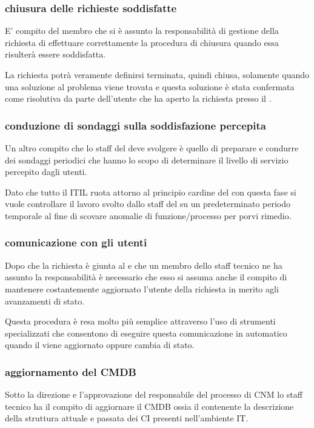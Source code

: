 \subsubsection[Chiusura delle richieste soddisfatte]{chiusura delle richieste soddisfatte}
E' compito del membro che si è assunto la responsabilità di gestione della richiesta di effettuare correttamente la procedura di chiusura quando essa risulterà essere soddisfatta.

La richiesta potrà veramente definirsi terminata, quindi chiusa, solamente quando una soluzione al problema viene trovata e questa soluzione è stata confermata come risolutiva da parte dell'utente che ha aperto la richiesta presso il .

\subsubsection[Conduzione di sondaggi sulla soddisfazione percepita]{conduzione di sondaggi sulla soddisfazione percepita}
Un altro compito che lo staff del  deve svolgere è quello di preparare e condurre dei sondaggi periodici che hanno lo scopo di determinare il livello di servizio percepito dagli utenti.

Dato che tutto il  \ac{ITIL} ruota attorno al principio cardine del  con questa fase si vuole controllare il lavoro svolto dallo staff del  su un predeterminato periodo temporale al fine di scovare anomalie di funzione/processo per porvi rimedio.

\subsubsection[Comunicazione con gli utenti]{comunicazione con gli utenti}
Dopo che la richiesta è giunta al  e che un membro dello staff tecnico ne ha assunto la responsabilità è necessario che esso si assuma anche il compito di mantenere costantemente aggiornato l'utente della richiesta in merito agli avanzamenti di stato.

Questa procedura è resa molto più semplice attraverso l'uso di strumenti  specializzati che consentono di eseguire questa comunicazione in automatico quando il  viene aggiornato oppure cambia di stato.

\subsubsection[Aggiornamento del CMDB]{aggiornamento del CMDB}
Sotto la direzione e l'approvazione del responsabile del processo di \ac{CNM} lo staff tecnico ha il compito di aggiornare il \ac{CMDB} ossia il  contenente la descrizione della struttura attuale e passata dei \ac{CI} presenti nell'ambiente \acs{IT}.

